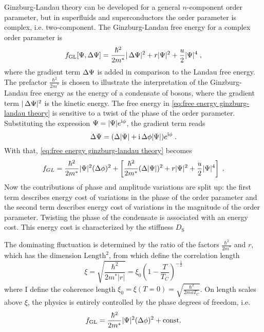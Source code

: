 \documentclass[../notes.tex]{subfiles}
\begin{document}
Ginzburg-Landau theory can be developed for a general \(n\)-component order parameter, but in superfluids and superconductors the order parameter is complex, i.e. two-component.
The Ginzburg-Landau free energy for a complex order parameter is
\begin{equation}
	f_{\mathrm{GL}} [\Psi, \adif{\Psi}] = \frac{\hbar^2}{2m^*} \vert \adif{\Psi} \vert^2 + r \vert \Psi \vert^2 + \frac{u}{2} \vert \Psi \vert^4 \;,
	\label{eq:free energy ginzburg-landau theory}
\end{equation}
where the gradient term \(\adif{\Psi}\) is added in comparison to the Landau free energy.
The prefactor \(\frac{\hbar^2}{2m^*}\) is chosen to illustrate the interpretation of the Ginzburg-Landau free energy as the energy of a condensate of bosons, where the gradient term \(\vert \adif{\Psi} \vert^2\) is the kinetic energy.
The free energy in \cref{eq:free energy ginzburg-landau theory} is sensitive to a twist of the phase of the order parameter.
Substituting the expression \(\Psi = \vert \Psi \vert e^{\mathrm{i} \phi}\), the gradient term reads
\begin{equation}
	\Delta \Psi = (\adif{\vert \Psi \vert} + \iu \adif{\phi} \vert \Psi \vert) e^{\iu \phi} \;.
\end{equation}
With that, \cref{eq:free energy ginzburg-landau theory} becomes
\begin{equation}
	f_{GL}  = \frac{\hbar^2}{2m^*} \vert \Psi \vert^2 (\adif{\phi})^2 + \left[ \frac{\hbar^2}{2m^*} (\adif{\vert \Psi \vert})^2 + r \vert \Psi \vert^2 + \frac{u}{2} \vert \Psi \vert^4 \right] \;.
	\label{eq:free energy ginzburg-landau theory with phase}
\end{equation}
Now the contributions of phase and amplitude variations are split up: the first term describes energy cost of variations in the phase of the order parameter and the second term describes energy cost of variations in the magnitude of the order parameter.
Twisting the phase of the condensate is associated with an energy cost.
This energy cost is characterized by the stiffness \(D_{\mathrm{S}}\)



The dominating fluctuation is determined by the ratio of the factors \(\frac{\hbar^2}{2m^*}\) and \(r\), which has the dimension \(\mathrm{Length}^2\), from which define the \gls{correlation length}
\begin{equation}
	\xi = \sqrt{\frac{\hbar^2}{2m^* \vert r \vert}} = \xi_0 \left(1 - \frac{T}{T_C}\right)^{-\frac{1}{2}}
	\label{eq:correlation length GL theory}
\end{equation}
where I define the \gls{coherence length} \(\xi_0 = \xi(T=0) = \sqrt{\frac{\hbar^2}{2 m a T_C}}\).
On length scales above \(\xi\), the physics is entirely controlled by the phase degrees of freedom, i.e.
\begin{equation}
	f_{\mathrm{GL}} = \frac{\hbar^2}{2 m^*} \vert \Psi \vert^2 (\adif{\phi})^2 + \mathrm{const.}
\end{equation}
\end{document}
